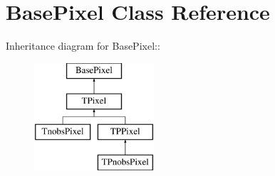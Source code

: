 \hypertarget{classBasePixel}{
\section{BasePixel Class Reference}
\label{classBasePixel}
}
Inheritance diagram for BasePixel::\begin{figure}[H]
\begin{center}
\leavevmode
\includegraphics[height=4cm]{classBasePixel}
\end{center}
\end{figure}
